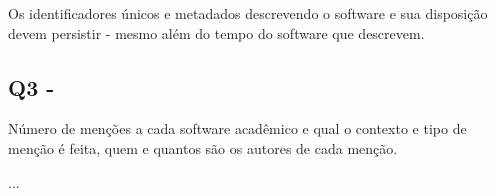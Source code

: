 
Os identificadores únicos e metadados descrevendo o software e sua disposição
devem persistir - mesmo além do tempo do software que descrevem.



\subsection{Q3 - \EstudoUmQuestaoTres}

Número de menções a cada software acadêmico e qual o contexto e tipo de menção
é feita, quem e quantos são os autores de cada menção.

...


